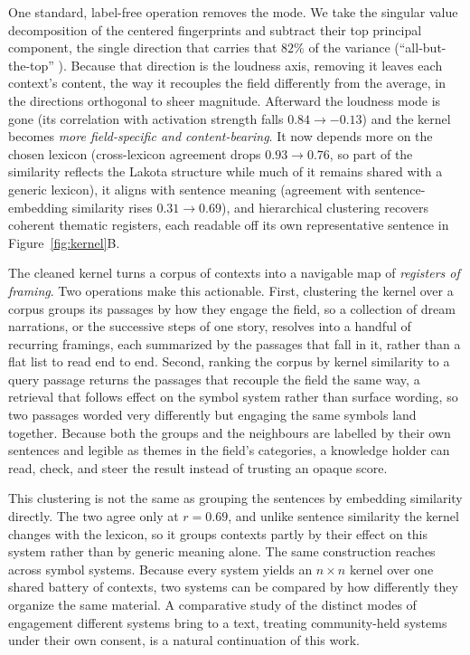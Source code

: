 \documentclass[final,creativeai]{article}
\begin{document}
One standard, label-free operation removes the mode. We take the singular value decomposition of the centered fingerprints and subtract their top principal component, the single direction that carries that $82\%$ of the variance (``all-but-the-top'' \citep{mu_allbutthetop_2018}). Because that direction is the loudness axis, removing it leaves each context's content, the way it recouples the field differently from the average, in the directions orthogonal to sheer magnitude. Afterward the loudness mode is gone (its correlation with activation strength falls $0.84 \to -0.13$) and the kernel becomes \emph{more field-specific and content-bearing}. It now depends more on the chosen lexicon (cross-lexicon agreement drops $0.93 \to 0.76$, so part of the similarity reflects the Lakota structure while much of it remains shared with a generic lexicon), it aligns with sentence meaning (agreement with sentence-embedding similarity rises $0.31 \to 0.69$), and hierarchical clustering recovers coherent thematic registers, each readable off its own representative sentence in Figure~\ref{fig:kernel}B.

The cleaned kernel turns a corpus of contexts into a navigable map of \emph{registers of framing}. Two operations make this actionable. First, clustering the kernel over a corpus groups its passages by how they engage the field, so a collection of dream narrations, or the successive steps of one story, resolves into a handful of recurring framings, each summarized by the passages that fall in it, rather than a flat list to read end to end. Second, ranking the corpus by kernel similarity to a query passage returns the passages that recouple the field the same way, a retrieval that follows effect on the symbol system rather than surface wording, so two passages worded very differently but engaging the same symbols land together. Because both the groups and the neighbours are labelled by their own sentences and legible as themes in the field's categories, a knowledge holder can read, check, and steer the result instead of trusting an opaque score.

This clustering is not the same as grouping the sentences by embedding similarity directly. The two agree only at $r=0.69$, and unlike sentence similarity the kernel changes with the lexicon, so it groups contexts partly by their effect on this system rather than by generic meaning alone. The same construction reaches across symbol systems. Because every system yields an $n \times n$ kernel over one shared battery of contexts, two systems can be compared by how differently they organize the same material. A comparative study of the distinct modes of engagement different systems bring to a text, treating community-held systems under their own consent, is a natural continuation of this work.
\end{document}
